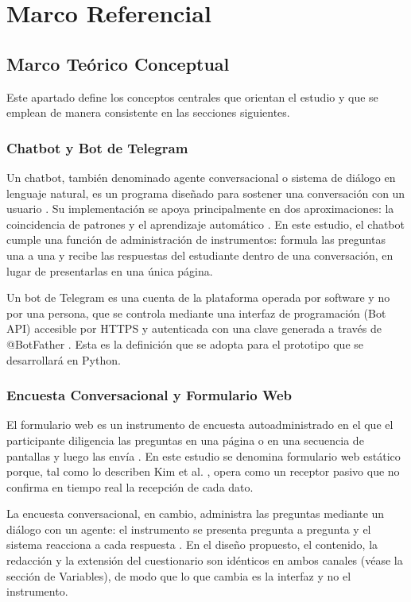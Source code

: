 \documentclass[12pt,letterpaper]{article}
\begin{document}
\section{Marco Referencial}

\subsection{Marco Teórico Conceptual}

Este apartado define los conceptos centrales que orientan el estudio y que se emplean de manera consistente en las secciones siguientes.
 
\subsubsection{Chatbot y Bot de Telegram}
 
Un chatbot, también denominado agente conversacional o sistema de diálogo en lenguaje natural, es un programa diseñado para sostener una conversación con un usuario \cite{adamopoulou2020}. Su implementación se apoya principalmente en dos aproximaciones: la coincidencia de patrones y el aprendizaje automático \cite{adamopoulou2020}. En este estudio, el chatbot cumple una función de administración de instrumentos: formula las preguntas una a una y recibe las respuestas del estudiante dentro de una conversación, en lugar de presentarlas en una única página.
 
Un bot de Telegram es una cuenta de la plataforma operada por software y no por una persona, que se controla mediante una interfaz de programación (Bot API) accesible por HTTPS y autenticada con una clave generada a través de @BotFather \cite{telegram2015}. Esta es la definición que se adopta para el prototipo que se desarrollará en Python.

\subsubsection{Encuesta Conversacional y Formulario Web}
 
El formulario web es un instrumento de encuesta autoadministrado en el que el participante diligencia las preguntas en una página o en una secuencia de pantallas y luego las envía \cite{couper2000}. En este estudio se denomina formulario web estático porque, tal como lo describen Kim et al. \cite{kim2019}, opera como un receptor pasivo que no confirma en tiempo real la recepción de cada dato.
 
La encuesta conversacional, en cambio, administra las preguntas mediante un diálogo con un agente: el instrumento se presenta pregunta a pregunta y el sistema reacciona a cada respuesta \cite{kim2019, xiao2020}. En el diseño propuesto, el contenido, la redacción y la extensión del cuestionario son idénticos en ambos canales (véase la sección de Variables), de modo que lo que cambia es la interfaz y no el instrumento.
 
\end{document}
